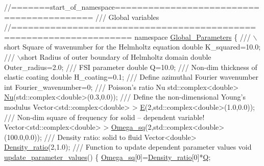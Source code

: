 \begin{DoxyCodeInclude}
\textcolor{comment}{//=======start\_of\_namespace==========================================}\textcolor{comment}{}
\textcolor{comment}{/// Global variables}
\textcolor{comment}{}\textcolor{comment}{//===================================================================}
\textcolor{keyword}{namespace }\hyperlink{namespaceGlobal__Parameters}{Global\_Parameters}
\{
\textcolor{comment}{}
\textcolor{comment}{ /// \(\backslash\)short Square of wavenumber for the Helmholtz equation}
\textcolor{comment}{} \textcolor{keywordtype}{double} K\_squared=10.0;
 \textcolor{comment}{}
\textcolor{comment}{ /// \(\backslash\)short Radius of outer boundary of Helmholtz domain}
\textcolor{comment}{} \textcolor{keywordtype}{double} Outer\_radius=2.0; 
\textcolor{comment}{}
\textcolor{comment}{ /// FSI parameter}
\textcolor{comment}{} \textcolor{keywordtype}{double} Q=10.0;
\textcolor{comment}{}
\textcolor{comment}{ /// Non-dim thickness of elastic coating}
\textcolor{comment}{} \textcolor{keywordtype}{double} H\_coating=0.1; 
\textcolor{comment}{}
\textcolor{comment}{ /// Define azimuthal Fourier wavenumber}
\textcolor{comment}{} \textcolor{keywordtype}{int} Fourier\_wavenumber=0;
   \textcolor{comment}{}
\textcolor{comment}{ /// Poisson's ratio Nu}
\textcolor{comment}{} std::complex<double> \hyperlink{namespaceGlobal__Parameters_a373950a959cd784c8f8028099807c2fb}{Nu}(std::complex<double>(0.3,0.0));
\textcolor{comment}{}
\textcolor{comment}{ /// Define the non-dimensional Young's modulus}
\textcolor{comment}{} Vector<std::complex<double> > \hyperlink{namespaceGlobal__Parameters_aa961bcca2115ce9cb37cc8ccb1b90cae}{E}(2,std::complex<double>(1.0,0.0));
\textcolor{comment}{}
\textcolor{comment}{ /// Non-dim square of frequency for solid -- dependent variable!}
\textcolor{comment}{} Vector<std::complex<double> > \hyperlink{namespaceGlobal__Parameters_a91314f7f1cc80c43543948568f50f405}{Omega\_sq}(2,std::complex<double>(100.0,0.0));
\textcolor{comment}{}
\textcolor{comment}{ /// Density ratio: solid to fluid}
\textcolor{comment}{}Vector<double> \hyperlink{namespaceGlobal__Parameters_a517d4c31b8bce6563c2f605266dd9679}{Density\_ratio}(2,1.0);
\textcolor{comment}{}
\textcolor{comment}{ /// Function to update dependent parameter values}
\textcolor{comment}{} \textcolor{keywordtype}{void} \hyperlink{namespaceGlobal__Parameters_ae0f9a80fb7510dbfbbef22582da231b7}{update\_parameter\_values}()
 \{
  \hyperlink{namespaceGlobal__Parameters_a91314f7f1cc80c43543948568f50f405}{Omega\_sq}[0]=\hyperlink{namespaceGlobal__Parameters_a517d4c31b8bce6563c2f605266dd9679}{Density\_ratio}[0]*\hyperlink{namespaceGlobal__Parameters_a7814fddf663e56168174a42d2cd6b4c1}{Q};

\end{DoxyCodeInclude}
